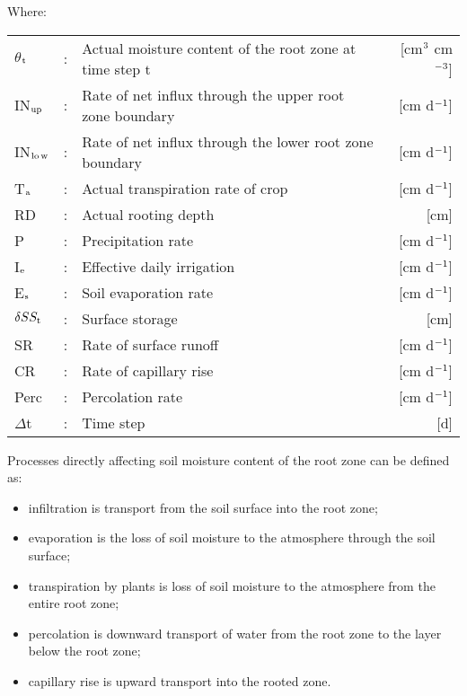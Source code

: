Where:\\[5pt]
\begin{tabularx}{\textwidth}{llXr}
	$\theta$$_{{\rm t}}$ &:& Actual moisture content of the root zone at time step t
	& [cm$^{{\rm 3}}$ cm$^{{\rm -3}}$]\\
	IN$_{{\rm up}}$ &:& Rate of net influx through the upper root zone boundary
	& [cm d$^{{\rm -1}}$]\\
	IN$_{{\rm lo}}$$_{{\rm w}}$ &:& Rate of net influx through the lower root zone boundary
	& [cm d$^{{\rm -1}}$]\\
	T$_{{\rm a}}$ &:& Actual transpiration rate of crop
	& [cm d$^{{\rm -1}}$]\\
	RD &:& Actual rooting depth  & [cm]\\
	P &:& Precipitation rate  & [cm d$^{{\rm -1}}$]\\
	I$_{{\rm e}}$ &:& Effective daily irrigation  & [cm d$^{{\rm -1}}$]\\
	E$_{{\rm s}}$ &:& Soil evaporation rate   & [cm d$^{{\rm -1}}$]\\
	$\delta SS_{{\rm t}}$ &:& Surface storage  & [cm]\\
	SR &:& Rate of surface runoff  & [cm d$^{{\rm -1}}$]\\
	CR &:& Rate of capillary rise  & [cm d$^{{\rm -1}}$]\\
	Perc &:& Percolation rate  & [cm d$^{{\rm -1}}$]\\
	$\Delta$t &:& Time step  & [d]\\
\end{tabularx}

Processes directly affecting soil moisture content of the root zone can be defined as:
\begin{itemize}
	\item infiltration is transport from the soil surface into the root zone;
	\item evaporation is the loss of soil moisture to the atmosphere through the soil surface;
	\item transpiration by plants is loss of soil moisture to the atmosphere 
	      from the entire root zone;
	\item percolation is downward transport of water from the root zone to the layer below the root zone;
	\item capillary rise is upward transport into the rooted zone.
\end{itemize}

